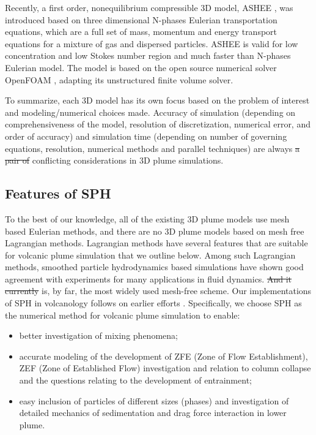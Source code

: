 \documentclass[gmd, manuscript]{copernicus} %
\providecommand{\DIFadd}[1]{{\protect\color{blue}\uwave{#1}}} %
\providecommand{\DIFdel}[1]{{\protect\color{red}\sout{#1}}}                      %
\providecommand{\DIFaddbegin}{} %
\providecommand{\DIFaddend}{} %
\providecommand{\DIFdelbegin}{} %
\providecommand{\DIFdelend}{} %
\begin{document}
Recently, a first order, nonequilibrium compressible 3D model, ASHEE \citep{cerminara2016ashee}, was introduced based on three dimensional N-phases Eulerian transportation equations, which are a full set of mass, momentum and energy transport equations for a mixture of gas and dispersed particles. ASHEE is valid for low concentration and low Stokes number region and much faster than N-phases Eulerian model. The model is based on the open source numerical solver OpenFOAM \citep{weller1998tensorial}, adapting its unstructured finite volume solver.

To summarize, each 3D model has its own focus based on the problem of interest and modeling/numerical choices made.
 Accuracy of simulation (depending on comprehensiveness of the model, resolution of discretization, numerical error, and order of accuracy) and simulation time (depending on number of governing equations, resolution, numerical methods and parallel techniques) are always \DIFdelbegin \DIFdel{a pair of }\DIFdelend conflicting considerations in 3D plume simulations.
\DIFdelbegin %
\DIFdelend 

\subsection{Features of SPH}
To the best of our knowledge, all of the existing 3D plume models use mesh based Eulerian methods, and there are no 3D plume models based on mesh free Lagrangian methods. Lagrangian methods have several features that are suitable for volcanic plume simulation that we outline below. Among such Lagrangian methods, smoothed particle hydrodynamics \citep{gingold1977smoothed,lucy1977numerical} based simulations have shown good agreement with experiments for many applications in fluid dynamics. \DIFdelbegin \DIFdel{And it currently }\DIFdelend \DIFaddbegin \DIFadd{Currently it }\DIFaddend is, by far, the most widely used mesh-free scheme. Our implementations of SPH in volcanology follows on earlier efforts   \citep{bursik2003smoothed,herault2010sph,haddad2016smoothed}.
Specifically, we choose SPH as the numerical method for volcanic plume simulation to enable:
\begin{itemize}
\item better investigation of mixing phenomena;
\item accurate modeling of the development of ZFE (Zone of Flow Establishment), ZEF (Zone of Established Flow) investigation and relation to column collapse and the questions relating to the development of entrainment;
\item  easy inclusion of particles of different sizes (phases) and investigation of detailed mechanics of sedimentation and drag force interaction in lower plume.
\end{itemize}
\DIFaddbegin 
\end{document}
